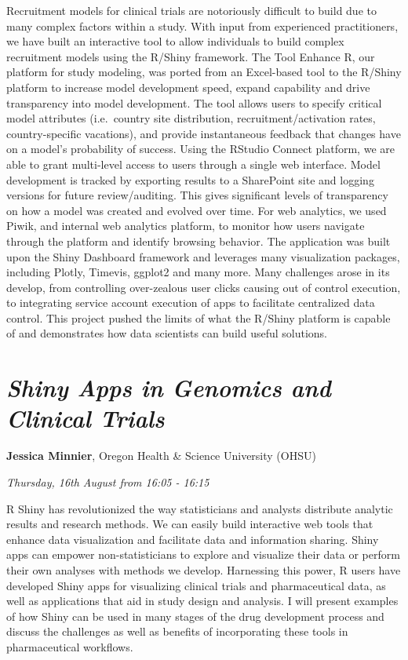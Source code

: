 \documentclass[]{book}
\theoremstyle{definition}
\theoremstyle{definition}
\theoremstyle{definition}
\theoremstyle{remark}
\begin{document}
Recruitment models for clinical trials are notoriously difficult to
build due to many complex factors within a study. With input from
experienced practitioners, we have built an interactive tool to allow
individuals to build complex recruitment models using the R/Shiny
framework. The Tool Enhance R, our platform for study modeling, was
ported from an Excel-based tool to the R/Shiny platform to increase
model development speed, expand capability and drive transparency into
model development. The tool allows users to specify critical model
attributes (i.e.~country site distribution, recruitment/activation
rates, country-specific vacations), and provide instantaneous feedback
that changes have on a model's probability of success. Using the RStudio
Connect platform, we are able to grant multi-level access to users
through a single web interface. Model development is tracked by
exporting results to a SharePoint site and logging versions for future
review/auditing. This gives significant levels of transparency on how a
model was created and evolved over time. For web analytics, we used
Piwik, and internal web analytics platform, to monitor how users
navigate through the platform and identify browsing behavior. The
application was built upon the Shiny Dashboard framework and leverages
many visualization packages, including Plotly, Timevis, ggplot2 and many
more. Many challenges arose in its develop, from controlling
over-zealous user clicks causing out of control execution, to
integrating service account execution of apps to facilitate centralized
data control. This project pushed the limits of what the R/Shiny
platform is capable of and demonstrates how data scientists can build
useful solutions.

\hypertarget{shiny-apps-in-genomics-and-clinical-trials}{%
\section{\texorpdfstring{\emph{Shiny Apps in Genomics and Clinical
Trials}}{Shiny Apps in Genomics and Clinical Trials}}\label{shiny-apps-in-genomics-and-clinical-trials}}

\textbf{Jessica Minnier}, Oregon Health \& Science University (OHSU)

\emph{Thursday, 16th August from 16:05 - 16:15}

R Shiny has revolutionized the way statisticians and analysts distribute
analytic results and research methods. We can easily build interactive
web tools that enhance data visualization and facilitate data and
information sharing. Shiny apps can empower non-statisticians to explore
and visualize their data or perform their own analyses with methods we
develop. Harnessing this power, R users have developed Shiny apps for
visualizing clinical trials and pharmaceutical data, as well as
applications that aid in study design and analysis. I will present
examples of how Shiny can be used in many stages of the drug development
process and discuss the challenges as well as benefits of incorporating
these tools in pharmaceutical workflows.
\end{document}
